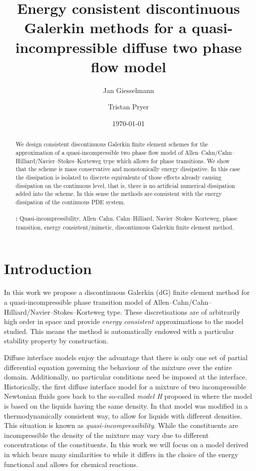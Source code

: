 \documentclass[final]{amsart}
\author{Jan Giesselmann}
\author{Tristan Pryer}
\title[Energy consistent DG methods for a quasi-incompressible
system]{Energy consistent discontinuous Galerkin methods for a
  quasi-incompressible diffuse two phase flow model}
\date{\today}
\numberwithin{equation}{section}
\begin{document}
\begin{abstract}
  We design consistent discontinuous Galerkin finite element schemes
  for the approximation of a quasi-incompressible two phase flow model
  of Allen--Cahn/Cahn--Hilliard/Navier--Stokes--Korteweg type which
  allows for phase transitions. We show that the scheme is mass
  conservative and monotonically energy dissipative. In this case the
  dissipation is isolated to discrete equivalents of those
  effects already causing dissipation on the continuous level, that
  is, there is no artificial numerical dissipation added
    into the scheme. In this sense the methods are consistent with
  the energy dissipation of the continuous PDE system.
  \\\\
  \smallskip
  \noindent
  \textbf{\keywordsname :} Quasi-incompressibility, Allen--Cahn,
  Cahn--Hilliard, Navier--Stokes--Korteweg, phase transition, energy
  consistent/mimetic, discontinuous Galerkin finite element method.
\end{abstract}


\maketitle

\section{Introduction}

In this work we propose a discontinuous Galerkin (dG) finite element
method for a quasi-incompressible phase transition model of
Allen--Cahn/Cahn--Hilliard/Navier--Stokes--Korteweg type. These
discretisations are of arbitrarily high order in space and provide
\emph{energy consistent} approximations to the model studied. This
means the method is automatically endowed with a particular stability
property by construction.

{Diffuse interface models enjoy the advantage that there is
  only one set of partial differential equation governing the
  behaviour of the mixture over the entire domain. Additionally, no
  particular conditions need be imposed at the interface.}
Historically, the first {diffuse interface} model for a mixture of two
incompressible Newtonian fluids goes back to the so-called \emph{model
  H} proposed in \cite{HH77} where the model is based on the liquids
having the same density.  In \cite{GPV96,LT98} that model was modified
in a thermodynamically consistent way, to allow for liquids with
different densities.  This situation is known as
\emph{quasi-incompressibility}. While the constituents are
incompressible the density of the mixture may vary due to different
concentrations of the constituents.  In this work we will focus on a
model derived in \cite{ADGK} which bears many similarities to
\cite{LT98} while it differs in the choice of the energy functional
and allows for chemical reactions.
\end{document}
